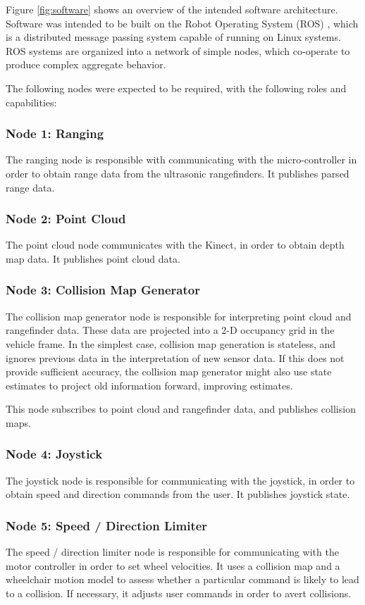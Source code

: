 \documentclass[oneside,final,a4paper]{report}
\begin{document}
Figure \ref{fig:software} shows an overview of the intended software architecture.  Software was intended to be built on the Robot Operating System (ROS) \cite{ROS}, which is a distributed message passing system capable of running on Linux systems.  ROS systems are organized into a network of simple nodes, which co-operate to produce complex aggregate behavior. 

The following nodes were expected to be required, with the following roles and capabilities:

\subsubsection{Node 1: Ranging}
The ranging node is responsible with communicating with the micro-controller in order to obtain range data from the ultrasonic rangefinders.  It publishes parsed range data.

\subsubsection{Node 2: Point Cloud}
The point cloud node communicates with the Kinect, in order to obtain depth map data.  It publishes point cloud data.

\subsubsection{Node 3: Collision Map Generator}
The collision map generator node is responsible for interpreting point cloud and rangefinder data.  These data are projected into a 2-D occupancy grid in the vehicle frame.  In the simplest case, collision map generation is stateless, and ignores previous data in the interpretation of new sensor data.  If this does not provide sufficient accuracy, the collision map generator might also use state estimates to project old information forward, improving estimates.  

This node subscribes to point cloud and rangefinder data, and publishes collision maps.

\subsubsection{Node 4: Joystick}
The joystick node is responsible for communicating with the joystick, in order to obtain speed and direction commands from the user.  It publishes joystick state.

\subsubsection{Node 5: Speed / Direction Limiter}
The speed / direction limiter node is responsible for communicating with the motor controller in order to set wheel velocities.  It uses a collision map and a wheelchair motion model to assess whether a particular command is likely to lead to a collision.  If necessary, it adjusts user commands in order to avert collisions.
\end{document}
